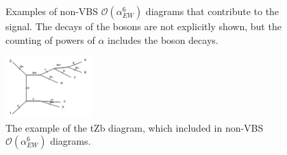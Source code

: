 \begin{figure}[tbp]
\begin{center}
{}
\caption{
Examples of non-VBS $\mathcal{O}(\alpha_{EW}^6)$ diagrams that contribute to the signal. The decays of the bosons are not
explicitly shown, but the counting of powers of $\alpha$ includes the boson decays.
}
\label{fig:feynmanEWKnonVBS}
\end{center}
\end{figure}

\begin{figure}[tbp]
\begin{center}
\includegraphics[width=0.3\textwidth,keepaspectratio]{figures/samples/feynEWKnonVBStZb.pdf}
\caption{
The example of the tZb diagram, which included in non-VBS $\mathcal{O}(\alpha_{EW}^6)$ diagrams.
}
\label{fig:feynmantZb}
\end{center}
\end{figure}

